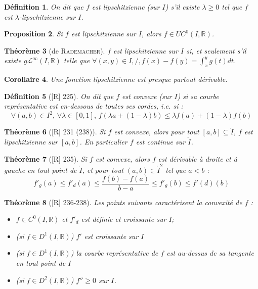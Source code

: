 \documentclass[10pt, a4paper, parskip=full, twoside, twocolumn]{report}
\newtheorem{definition}{Définition}
\newtheorem{theorem}[definition]{Théorème}
\newtheorem{proposition}[definition]{Proposition}
\newtheorem{corollary}[definition]{Corollaire}
\newcommand{\IR}{\mathbb{R}}
\begin{document}
\begin{definition}
	On dit que $f$ est \emph{lipschitzienne} (sur $I$) s'il existe $\lambda \geq 0$ tel que $f$ est $\lambda$-lipschitzienne sur $I$.
\end{definition}

\begin{proposition}
	Si $f$ est lipschitzienne sur $I$, alors $f\in UC^0(I,\IR)$.
\end{proposition}

\begin{theorem}[de \textsc{Rademacher}]
	$f$ est lipschitzienne sur $I$ si, et seulement s'il existe $g\mathcal{L}^{\infty}(I,\IR)$ telle que $\forall (x,y)\in I,/, f(x) - f(y) = \int_{x}^{y}g(t)dt$.
\end{theorem}

\begin{corollary}
	Une fonction lipschitzienne est presque partout dérivable.
\end{corollary}

\begin{definition}[\textnormal{[R] 225}]
	On dit que $f$ est \emph{convexe (sur $I$)} si sa courbe représentative est en-dessous de toutes ses cordes, \emph{i.e.} si :
	$$\forall (a,b)\in I^2,\, \forall \lambda\in [0,1],\, f(\lambda a + (1-\lambda)b) \leq \lambda f(a) + (1-\lambda)f(b)$$
\end{definition}

\begin{theorem}[\textnormal{[R] 231 (238)}]
	Si $f$ est convexe, alors pour tout $[a,b]\subseteq \mathring{I}$, $f$ est lipschitzienne sur $[a,b]$. En particulier $f$ est continue sur $\mathring{I}$.
\end{theorem}

\begin{theorem}[\textnormal{[R] 235}]
	Si $f$ est convexe, alors $f$ est dérivable à droite et à gauche en tout point de $\mathring{I}$, et pour tout $(a,b)\in \mathring{I}^2$ tel que $a<b$ :
	$$f'_g(a) \leq f'_d(a)\leq \frac{f(b)-f(a)}{b-a}\leq f'_g(b)\leq f'(d)(b)$$
\end{theorem}

\begin{theorem}[\textnormal{[R] 236-238}]
	Les points suivants caractérisent la convexité de $f$ :
	\begin{itemize}
		\item $f\in C^0(I,\IR)$ et $f'_d$ est définie et croissante sur $I$;
		\item (si $f\in D^1(I,\IR)$) $f'$ est croissante sur $I$
		\item (si $f\in D^1(I, \IR)$) la courbe représentative de $f$ est au-dessus de sa tangente en tout point de $I$
		\item (si $f\in D^2(I,\IR)$) $f''\geq 0$ sur $I$.
	\end{itemize}
\end{theorem}
\end{document}
